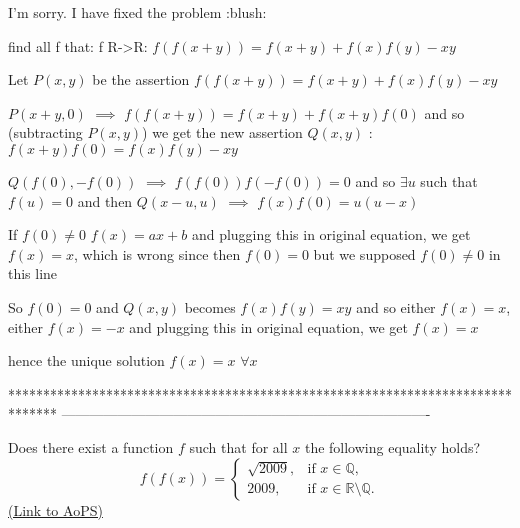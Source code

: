 \begin{solution}
	I'm sorry. I have fixed the problem  :blush:
\end{solution}



\begin{solution}
	\begin{tcolorbox}find all f that: f R->R:
$ f(f(x + y)) = f(x + y) + f(x)f(y) - xy$\end{tcolorbox}

Let $ P(x,y)$ be the assertion $ f(f(x + y)) = f(x + y) + f(x)f(y) - xy$

$ P(x + y,0)$ $ \implies$ $ f(f(x + y)) = f(x + y) + f(x + y)f(0)$ and so (subtracting $ P(x,y)$) we get the new assertion $ Q(x,y)$ : $ f(x + y)f(0) = f(x)f(y) - xy$

$ Q(f(0), - f(0))$ $ \implies$ $ f(f(0))f( - f(0)) = 0$ and so $ \exists u$ such that $ f(u) = 0$ and then $ Q(x - u,u)$ $ \implies$  $ f(x)f(0) = u(u - x)$

If $ f(0)\neq 0$ $ f(x) = ax + b$ and plugging this in original equation, we get $ f(x) = x$, which is wrong since then $ f(0) = 0$ but we supposed $ f(0)\ne 0$ in this line

So $ f(0) = 0$ and $ Q(x,y)$ becomes $ f(x)f(y) = xy$ and so either $ f(x) = x$, either $ f(x) = - x$ and plugging this in original equation, we get $ f(x) = x$

hence the unique solution $ \boxed{f(x) = x}$ $ \forall x$
\end{solution}
*******************************************************************************
-------------------------------------------------------------------------------

\begin{problem}
	Does there exist a function $f$ such that for all $x$ the following equality holds?  
\[ f(f(x)) = \begin{cases}
\sqrt{2009}, & \mbox{if } x\in \mathbb Q,\\
 2009, &\mbox{if } x\in\mathbb{R} \setminus \mathbb Q.
\end{cases}
\]
	\flushright \href{https://artofproblemsolving.com/community/c6h308559}{(Link to AoPS)}
\end{problem}



